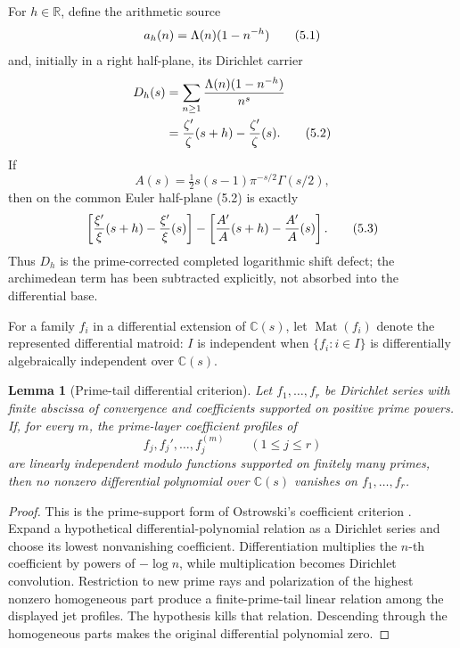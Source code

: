 \documentclass[11pt]{article}
\newtheorem{lemma}[theorem]{Lemma}
\theoremstyle{definition}
\theoremstyle{remark}
\newcommand{\C}{\mathbb C}
\newcommand{\R}{\mathbb R}
\newcommand{\Mat}{\operatorname{Mat}}
\newcommand{\eqtag}[1]{\qquad\text{\upshape(#1)}}
\begin{document}
For \(h\in\R\), define the arithmetic source
\[
  a_h(n)=\Lambda(n)(1-n^{-h})                         \eqtag{5.1}
\]
and, initially in a right half-plane, its Dirichlet carrier
\[
\begin{aligned}
  D_h(s)
  &=\sum_{n\geq1}\frac{\Lambda(n)(1-n^{-h})}{n^s}\\
  &=\frac{\zeta'}{\zeta}(s+h)-\frac{\zeta'}{\zeta}(s).              \eqtag{5.2}
\end{aligned}
\]
If
\[
 A(s)=\tfrac12s(s-1)\pi^{-s/2}\Gamma(s/2),
\]
then on the common Euler half-plane (5.2) is exactly
\[
 \left[\frac{\xi'}{\xi}(s+h)-\frac{\xi'}{\xi}(s)\right]
 -
 \left[\frac{A'}{A}(s+h)-\frac{A'}{A}(s)\right].     \eqtag{5.3}
\]
Thus \(D_h\) is the prime-corrected completed logarithmic shift defect;
the archimedean term has been subtracted explicitly, not absorbed into
the differential base.

For a family \(f_i\) in a differential extension of \(\C(s)\), let
\(\Mat(f_i)\) denote the represented differential matroid:
\(I\) is independent when \(\{f_i:i\in I\}\) is differentially
algebraically independent over \(\C(s)\).

\begin{lemma}[Prime-tail differential criterion]
\label{lem:ostrowski}
Let \(f_1,\ldots,f_r\) be Dirichlet series with finite abscissa of
convergence and coefficients supported on positive prime powers.  If,
for every \(m\), the prime-layer coefficient profiles of
\[
 f_j,f_j',\ldots,f_j^{(m)}\qquad(1\leq j\leq r)
\]
are linearly independent modulo functions supported on finitely many
primes, then no nonzero differential polynomial over \(\C(s)\)
vanishes on \(f_1,\ldots,f_r\).
\end{lemma}

\begin{proof}
This is the prime-support form of Ostrowski's coefficient criterion
\cite{Ostrowski1920,Pong2016}.  Expand a hypothetical
differential-polynomial relation as a Dirichlet series and choose its
lowest nonvanishing coefficient.  Differentiation multiplies the
\(n\)-th coefficient by powers of \(-\log n\), while multiplication
becomes Dirichlet convolution.  Restriction to new prime rays and
polarization of the highest nonzero homogeneous part produce a
finite-prime-tail linear relation among the displayed jet profiles.
The hypothesis kills that relation.  Descending through the homogeneous
parts makes the original differential polynomial zero.
\end{proof}
\end{document}
